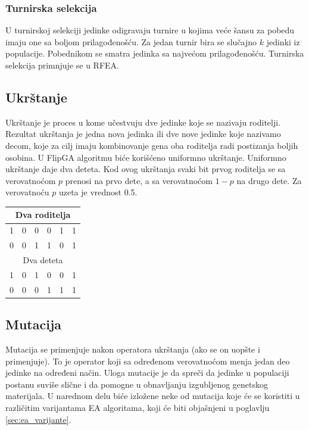 \documentclass[a4paper]{article}
\begin{document}
\subsubsection{Turnirska selekcija}
\label{sec:ea_turnirska}
U turnirskoj selekciji \cite{vi_Janicic} jedinke odigravaju turnire u kojima veće šansu za
pobedu imaju one sa boljom prilagođenošću. Za jedan turnir bira se slučajno $k$ jedinki iz
populacije. Pobednikom se smatra jedinka sa najvećom prilagođenošću. 
Turnirska selekcija primnjuje se u RFEA.

\subsection{Ukrštanje}
 \label{sec:ea_ukrstanje}
Ukrštanje \cite{vi_Janicic} je proces u kome učestvuju dve jedinke koje se nazivaju roditelji. 
Rezultat ukrštanja je jedna nova jedinka ili dve nove jedinke koje nazivamo decom, koje
za cilj imaju kombinovanje gena oba roditelja radi postizanja boljih osobina.
U FlipGA algoritmu biće korišćeno uniformno ukrštanje.
Uniformno ukrštanje daje dva deteta. Kod ovog ukrštanja svaki bit prvog roditelja 
se sa verovatnoćom $p$ prenosi na prvo dete, a sa verovatnoćom $1-p$ na drugo dete. 
Za verovatnoću $p$ uzeta je vrednost 0.5. 

\begin{table}[h!]
\centering
{}\label{tab:ea_ukrstanje} 
\begin{tabular}{|*{6}{c|}}
  \multicolumn{6}{c}{Dva roditelja} \\ \hline
  \rowcolor{Gray}  
  1 & 0 & 0 & 0 & 1 & 1 \\ \hline
  0 & 0 & 1 & 1 & 0 & 1 \\ \hline
  \multicolumn{6}{c}{Dva deteta} \\ \hline
  \cellcolor{Gray} 1 & 0 & 1 & \cellcolor{Gray} 0 & 0 & \cellcolor{Gray} 1 \\ \hline
  0 & \cellcolor{Gray} 0 & \cellcolor{Gray} 0 & 1 & \cellcolor{Gray} 1 & 1 \\ \hline
\end{tabular}
\end{table}


\subsection{Mutacija}
 \label{sec:ea_mutacija}
Mutacija \cite{vi_Janicic} se primenjuje nakon operatora ukrštanja 
(ako se on uopšte i primenjuje). 
To je operator koji sa određenom verovatnoćom menja jedan deo jedinke na određeni način. 
Uloga mutacije je da spreči da jedinke u populaciji postanu suviše slične 
i da pomogne u obnavljanju izgubljenog genetskog materijala.
U narednom delu biće izložene neke od mutacija koje će se koristiti u 
različitim varijantama EA algoritama, koji će biti objašnjeni u poglavlju
\ref{sec:ea_varijante}.
\end{document}
